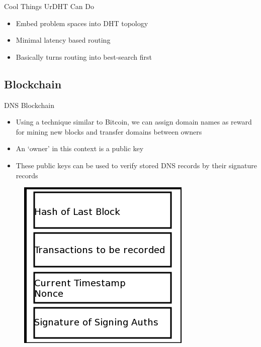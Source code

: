 \documentclass[11pt]{beamer}
\begin{document}

\begin{frame}{Cool Things UrDHT Can Do}
	\begin{itemize}
		\item Embed problem spaces into DHT topology
		\item Minimal latency based routing
		\item Basically turns routing into best-search first
		
	\end{itemize}
\end{frame}



\subsection{Blockchain}

\begin{frame}{DNS Blockchain}
	\begin{itemize}
		\item Using a technique similar to Bitcoin, we can assign domain names as reward for mining new blocks and transfer domains between owners
		
		\item An `owner' in this context is a public key
		
		\item These public keys can be used to verify stored DNS records by their signature records
	\end{itemize}
	
	
	\begin{figure}
		\centering
		\includegraphics[width=0.3\linewidth]{namecoin_block}
		\label{fig:blockchain}
	\end{figure}
	
\end{frame}
\end{document}

